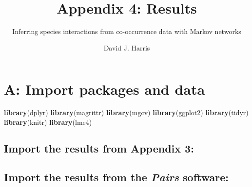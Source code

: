 \documentclass[11pt,]{article}
\title{Appendix 4: Results}
\subtitle{Inferring species interactions from co-occurrence data with Markov
networks}
\author{David J. Harris}
\date{}
\newenvironment{Shaded}{\begin{snugshade}}{\end{snugshade}}
\newcommand{\KeywordTok}[1]{\textcolor[rgb]{0.13,0.29,0.53}{\textbf{{#1}}}}
\newcommand{\DataTypeTok}[1]{\textcolor[rgb]{0.13,0.29,0.53}{{#1}}}
\newcommand{\StringTok}[1]{\textcolor[rgb]{0.31,0.60,0.02}{{#1}}}
\newcommand{\OtherTok}[1]{\textcolor[rgb]{0.56,0.35,0.01}{{#1}}}
\newcommand{\NormalTok}[1]{{#1}}
\begin{document}
\maketitle

{
\hypersetup{linkcolor=black}
\setcounter{tocdepth}{2}
\tableofcontents
}
\section{A: Import packages and data}\label{a-import-packages-and-data}

\begin{Shaded}
\begin{Highlighting}[]
\KeywordTok{library}\NormalTok{(dplyr)}
\KeywordTok{library}\NormalTok{(magrittr)}
\KeywordTok{library}\NormalTok{(mgcv)}
\KeywordTok{library}\NormalTok{(ggplot2)}
\KeywordTok{library}\NormalTok{(tidyr)}
\KeywordTok{library}\NormalTok{(knitr)}
\KeywordTok{library}\NormalTok{(lme4)}
\end{Highlighting}
\end{Shaded}

\subsection{Import the results from Appendix
3:}\label{import-the-results-from-appendix-3}

\begin{Shaded}
\end{Shaded}

\subsection{\texorpdfstring{Import the results from the \emph{Pairs}
software:}{Import the results from the Pairs software:}}\label{import-the-results-from-the-pairs-software}
\end{document}
